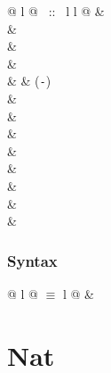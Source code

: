 \begin{isabellebody}
\begin{isamarkuptext}
\begin{supertabular}{@ {} l @ {~::~} l l @ {}}
 & \\
 & \\
 & \\
 & \\
 &  & (\verb$-$)\\
 & \\
 & \\
 & \\
 & \\
 & \\
 & \\
 & \\
 & \\
\end{supertabular}

\subsubsection*{Syntax}

\begin{tabular}{@ {} l @ {\quad$\equiv$\quad} l @ {}}
 & 
\end{tabular}


\section{Nat}


\end{isamarkuptext}
\end{isabellebody}
